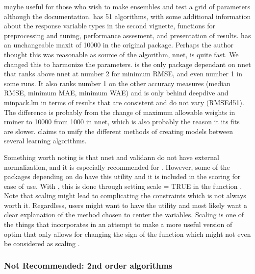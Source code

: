  \citep{R-EnsembleBase} maybe useful for those who
wish to make ensembles and test a grid of parameters although the
documentation.  \citep{R-MachineShop} has 51
algorithms, with some additional information about the response variable
types in the second vignette, functions for preprocessing and tuning,
performance assesment, and presentation of results.
 \citep{R-radiant.model} has an unchangeable
maxit of 10000 in the original package. Perhaps the author thought this
was reasonable as source of the algorithm, nnet, is quite fast. We
changed this to harmonize the parameters. 
\citep{R-rminer} is the only package dependant on nnet that ranks above
nnet at number 2 for minimum RMSE, and even number 1 in some runs. It
also ranks number 1 on the other accuracy measures (median RMSE, minimum
MAE, minimum WAE) and is only behind deepdive and minpack.lm in terms of
results that are consistent and do not vary (RMSEd51). The difference is
probably from the change of maximum allowable weights in rminer to 10000
from 1000 in nnet, which is also probably the reason it its fits are
slower.  \citep{R-traineR} claims to unify the
different methods of creating models between several learning
algorithms.

Something worth noting is that nnet and validann do not have external
normalization, and it is especially recommended for  .
However, some of the packages depending on  do have this
utility and it is included in the scoring for ease of use. With
, this is done through setting scale = TRUE in the
function . Note that scaling might lead to complicating
the constraints which is not always worth it. Regardless, users might
want to have the utility and most likely want a clear explanation of the
method chosen to center the variables. Scaling is one of the things that
 \citep{R-optimx} incorporates in an attempt to make a
more useful version of optim that only allows for changing the sign of
the function which might not even be considered as scaling
\citep{Nash-nlpor14}.

\hypertarget{not-recommended-2nd-order-algorithms}{%
\subsubsection{Not Recommended: 2nd order
algorithms}\label{not-recommended-2nd-order-algorithms}}

